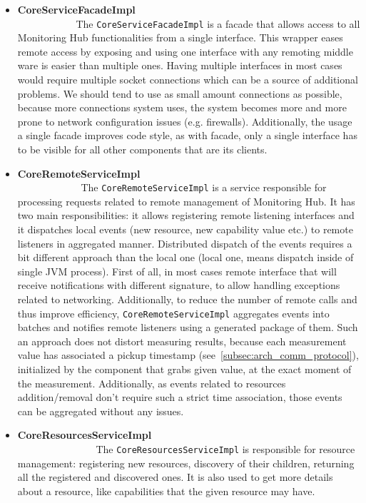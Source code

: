 \begin{itemize}

\item {\bf CoreServiceFacadeImpl}~~~~~~~~~~~~~~~~~~~~~~~~~~~~~~~~~~~~~~~~~~~~~~~~~~~~~~~~\linebreak
The \texttt{CoreServiceFacadeImpl} is a facade that allows access to all Monitoring Hub functionalities from a single interface. This wrapper eases remote access by exposing and using one interface with any remoting middle ware is easier than multiple ones. Having multiple interfaces in most cases would require multiple socket connections which can be a source of additional problems. We should tend to use as small amount connections as possible, because more connections system uses, the system becomes more and more prone to network configuration issues (e.g. firewalls). Additionally, the usage a single facade improves code style, as with facade, only a single interface has to be visible for all other components that are its clients.

\item {\bf CoreRemoteServiceImpl}~~~~~~~~~~~~~~~~~~~~~~~~~~~~~~~~~~~~~~~~~~~~~~~~~~~~~~~~\linebreak
The \texttt{CoreRemoteServiceImpl} is a service responsible for processing requests related to remote management of Monitoring Hub. It has two main responsibilities: it allows registering remote listening interfaces and it dispatches local events (new resource, new capability value etc.) to remote listeners in aggregated manner. Distributed dispatch of the events requires a bit different approach than the local one (local one, means dispatch inside of single JVM process). First of all, in most cases remote interface that will receive notifications with different signature, to allow handling exceptions related to networking. Additionally, to reduce the number of remote calls and thus improve efficiency, \texttt{CoreRemoteServiceImpl} aggregates events into batches and notifies remote listeners using a generated package of them. Such an approach does not distort measuring results, because each measurement value has associated a pickup timestamp (see~\ref{subsec:arch_comm_protocol}), initialized by the component that grabs given value, at the exact moment of the measurement. Additionally, as events related to resources addition/removal don\rq{}t require such a strict time association, those events can be aggregated without any issues.

\item {\bf CoreResourcesServiceImpl}~~~~~~~~~~~~~~~~~~~~~~~~~~~~~~~~~~~~~~~~~~~~~~~~~~~~~~~~\linebreak
The \texttt{CoreResourcesServiceImpl} is responsible for resource management: registering new resources, discovery of their children, returning all the registered and discovered ones. It is also used to get more details about a resource, like capabilities that the given resource may have.


\end{itemize}
